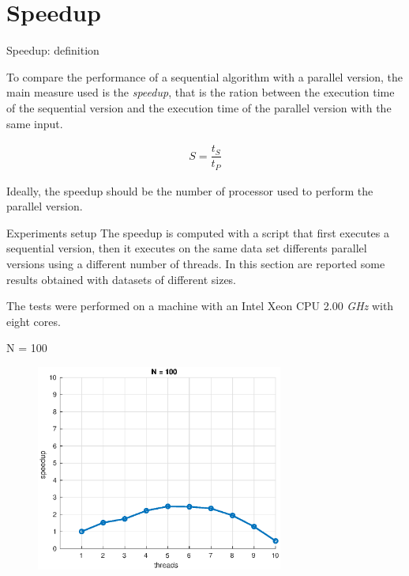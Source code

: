 \documentclass{beamer}
\begin{document}
\section{Speedup}


\begin{frame}{Speedup: definition}

To compare the performance of a sequential algorithm with a parallel version, the main measure used is the \textit{speedup}, that is the ration between the execution time of the sequential version and the execution time of the parallel version with the same input.

\begin{align}
S = \dfrac{t_S}{t_P}
\end{align}

Ideally, the speedup should be the number of processor used to perform the parallel version.

\end{frame}


\begin{frame}{Experiments setup}
The speedup is computed with a script that first executes a sequential version, then it executes on the same data set differents parallel versions using a different number of threads. In this section are reported some results obtained with datasets of different sizes.

The tests were performed on a machine with an Intel Xeon CPU 2.00 \textit{GHz} with eight cores.
\end{frame}


\begin{frame}{N = 100}

\begin{figure}[H]
\centering
\includegraphics[width=3.2in]{../Paper/fig/speedup100.eps}
\end{figure}

\end{frame}
\end{document}
